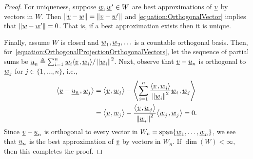 \begin{proof}

For uniqueness, suppose $\underline{w}, \underline{w}' \in W$ are best approximations of $\underline{v}$ by vectors in $W$.
Then $\left\| \underline{v} - \underline{w} \right\| = \left\| \underline{v} - \underline{w}' \right\|$ and \eqref{equation:OrthogonalVector} implies that $\left\| \underline{w} - \underline{w}' \right\| = 0$.
That is, if a best approximation exists then it is unique.

Finally, assume $W$ is closed and $\underline{w}_1,\underline{w}_2, \ldots$ is a countable orthogonal basis.
Then, for~\eqref{equation:OrthogonalProjectionOrthogonalVectors}, let the sequence of partial sums be $\underline{u}_n \triangleq \sum_{i=1}^n \underline{w}_i {\left\langle  \underline{v}  \mskip2mu ,  \underline{w}_i  \right\rangle} / \left\| \underline{w}_i \right\|^2$.
Next, observe that $\underline{v} -\underline{u}_n$ is orthogonal to $\underline{w}_j$ for $j \in \{1,\ldots,n\}$, i.e.,
\begin{equation*}
\begin{split}
{\left\langle  \underline{v} - \underline{u_n}  \mskip2mu ,  \underline{w}_j  \right\rangle}
&= {\left\langle  \underline{v}  \mskip2mu ,  \underline{w}_j  \right\rangle}
- {\left\langle  \sum_{i=1}^n \frac{ {\left\langle  \underline{v}  \mskip2mu ,  \underline{w}_i  \right\rangle} }{ \left\| \underline{w}_i \right\|^2 } \underline{w}_i  \mskip2mu ,  \underline{w}_j  \right\rangle} \\
&= {\left\langle  \underline{v}  \mskip2mu ,  \underline{w}_j  \right\rangle}
- \frac{ {\left\langle  \underline{v}  \mskip2mu ,  \underline{w}_j  \right\rangle} }{ \left\| \underline{w}_i \right\|^2 } {\left\langle  \underline{w}_j  \mskip2mu ,  \underline{w}_j  \right\rangle}
= 0.
\end{split}
\end{equation*}
Since $\underline{v} - \underline{u}_n$ is orthogonal to every vector in $W_n = \mathrm{span} \{\underline{w}_1,\ldots,\underline{w}_n\}$, we see that $\underline{u}_n$ is the best approximation of $\underline{v}$ by vectors in $W_n$.
If $\dim(W) < \infty$, then this completes the proof.


\end{proof}
